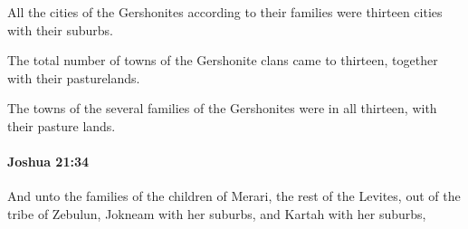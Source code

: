 			\begin{versebox}
					\item[BHS] 
					\item[ASV] All the cities of the Gershonites according to their families were thirteen cities with their suburbs.
					\item[NIV] The total number of towns of the Gershonite clans came to thirteen, together with their pasturelands.
					\item[NRSV] The towns of the several families of the Gershonites were in all thirteen, with their pasture lands.
			\end{versebox}

		\paragraph{Joshua 21:34} %
			\label{JOSHUA-21-34}

			And unto the families of the children of Merari, the rest of the Levites, out of the tribe of Zebulun, Jokneam with her suburbs, and Kartah with her suburbs,

